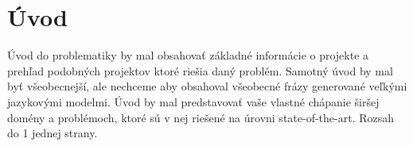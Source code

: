\section{Úvod}
Úvod do problematiky by mal obsahovať základné informácie o projekte a prehľad podobných projektov ktoré riešia daný problém. Samotný úvod by mal byť všeobecnejší, ale nechceme aby obsahoval všeobecné frázy generované veľkými jazykovými modelmi. Úvod by mal predstavovať vaše vlastné chápanie širšej domény a problémoch, ktoré sú v nej riešené na úrovni state-of-the-art. Rozsah do 1 jednej strany. 

